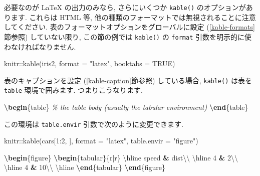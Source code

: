 \documentclass[
  11pt,
  lualatex,
  ja=standard]{bxjsreport}
\newenvironment{Shaded}{\begin{snugshade}}{\end{snugshade}}
\newcommand{\AttributeTok}[1]{\textcolor[rgb]{0.77,0.63,0.00}{#1}}
\newcommand{\CommentTok}[1]{\textcolor[rgb]{0.56,0.35,0.01}{\textit{#1}}}
\newcommand{\ConstantTok}[1]{\textcolor[rgb]{0.00,0.00,0.00}{#1}}
\newcommand{\DecValTok}[1]{\textcolor[rgb]{0.00,0.00,0.81}{#1}}
\newcommand{\ExtensionTok}[1]{#1}
\newcommand{\FunctionTok}[1]{\textcolor[rgb]{0.00,0.00,0.00}{#1}}
\newcommand{\KeywordTok}[1]{\textcolor[rgb]{0.13,0.29,0.53}{\textbf{#1}}}
\newcommand{\NormalTok}[1]{#1}
\newcommand{\OperatorTok}[1]{\textcolor[rgb]{0.81,0.36,0.00}{\textbf{#1}}}
\newcommand{\SpecialCharTok}[1]{\textcolor[rgb]{0.00,0.00,0.00}{#1}}
\newcommand{\StringTok}[1]{\textcolor[rgb]{0.31,0.60,0.02}{#1}}
\begin{document}
必要なのが LaTeX の出力のみなら, さらにいくつか \texttt{kable()} のオプションがあります. これらは HTML 等, 他の種類のフォーマットでは無視されることに注意してください. 表のフォーマットオプションをグローバルに設定 (\ref{kable-formats}節参照) していない限り, この節の例では \texttt{kable()} の \texttt{format} 引数を明示的に使わなければなりません.

\begin{Shaded}
\begin{Highlighting}[numbers=left,,]
\NormalTok{knitr}\SpecialCharTok{::}\FunctionTok{kable}\NormalTok{(iris2, }\AttributeTok{format =} \StringTok{"latex"}\NormalTok{, }\AttributeTok{booktabs =} \ConstantTok{TRUE}\NormalTok{)}
\end{Highlighting}
\end{Shaded}

表のキャプションを設定 (\ref{kable-caption}節参照) している場合, \texttt{kable()} は表を \texttt{table} 環境で囲みます. つまりこうなります.

\begin{Shaded}
\begin{Highlighting}[]
\KeywordTok{\textbackslash{}begin}\NormalTok{\{}\ExtensionTok{table}\NormalTok{\}}
\CommentTok{\% the table body (usually the tabular environment)}
\KeywordTok{\textbackslash{}end}\NormalTok{\{}\ExtensionTok{table}\NormalTok{\}}
\end{Highlighting}
\end{Shaded}

この環境は \texttt{table.envir} 引数で次のように変更できます.

\begin{Shaded}
\begin{Highlighting}[numbers=left,,]
\NormalTok{knitr}\SpecialCharTok{::}\FunctionTok{kable}\NormalTok{(cars[}\DecValTok{1}\SpecialCharTok{:}\DecValTok{2}\NormalTok{, ], }\AttributeTok{format =} \StringTok{"latex"}\NormalTok{, }\AttributeTok{table.envir =} \StringTok{"figure"}\NormalTok{)}
\end{Highlighting}
\end{Shaded}

\begin{Shaded}
\begin{Highlighting}[]
\KeywordTok{\textbackslash{}begin}\NormalTok{\{}\ExtensionTok{figure}\NormalTok{\}}
\KeywordTok{\textbackslash{}begin}\NormalTok{\{}\ExtensionTok{tabular}\NormalTok{\}\{r|r\}}
\FunctionTok{\textbackslash{}hline}
\NormalTok{speed }\OperatorTok{\&}\NormalTok{ dist}\FunctionTok{\textbackslash{}\textbackslash{}}
\FunctionTok{\textbackslash{}hline}
\NormalTok{4 }\OperatorTok{\&}\NormalTok{ 2}\FunctionTok{\textbackslash{}\textbackslash{}}
\FunctionTok{\textbackslash{}hline}
\NormalTok{4 }\OperatorTok{\&}\NormalTok{ 10}\FunctionTok{\textbackslash{}\textbackslash{}}
\FunctionTok{\textbackslash{}hline}
\KeywordTok{\textbackslash{}end}\NormalTok{\{}\ExtensionTok{tabular}\NormalTok{\}}
\KeywordTok{\textbackslash{}end}\NormalTok{\{}\ExtensionTok{figure}\NormalTok{\}}
\end{Highlighting}
\end{Shaded}
\end{document}
